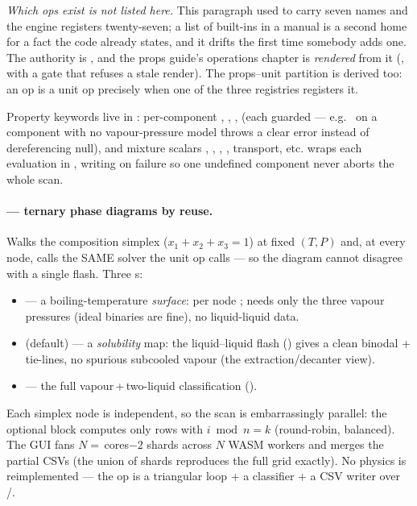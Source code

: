 \documentclass[11pt,a4paper]{article}
\begin{document}
\emph{Which ops exist is not listed here.}  This paragraph used to carry
seven names and the engine registers twenty-seven; a list of built-ins in a
manual is a second home for a fact the code already states, and it drifts
the first time somebody adds one.  The authority is
, and the props guide's operations chapter is
\emph{rendered} from it (, with a
 gate that refuses a stale render).  The props--unit
partition is derived too: an op is a unit op precisely when one of the three
 registries registers it.

Property keywords live in : per-component
, , , 
(each guarded --- e.g.\  on a component with no vapour-pressure
model throws a clear error instead of dereferencing null), and mixture scalars
, , , , transport, etc.
 wraps each evaluation in , writing
 on failure so one undefined component never aborts the whole scan.

\paragraph{ --- ternary phase diagrams by reuse.}
Walks the composition simplex (\(x_1+x_2+x_3=1\)) at fixed \((T,P)\) and, at
every node, calls the SAME solver the  unit op calls ---
so the diagram cannot disagree with a single flash. Three s:
\begin{itemize}[leftmargin=*]
  \item {} --- a boiling-temperature \emph{surface}: per node
        ; needs only the three vapour pressures
        (ideal binaries are fine), no liquid-liquid data.
  \item {} (default) --- a \emph{solubility} map: the liquid--liquid
        flash () gives a clean binodal + tie-lines, no
        spurious subcooled vapour (the extraction/decanter view).
  \item {} --- the full vapour\,+\,two-liquid classification
        ().
\end{itemize}
Each simplex node is independent, so the scan is embarrassingly parallel: the
optional  block computes only rows with \(i \bmod n = k\)
(round-robin, balanced). The GUI fans \(N=\)\,cores\(-2\) shards across \(N\)
WASM workers and merges the partial CSVs (the union of shards reproduces the
full grid exactly). No physics is reimplemented --- the op is a triangular loop
+ a classifier + a CSV writer over /.
\end{document}

